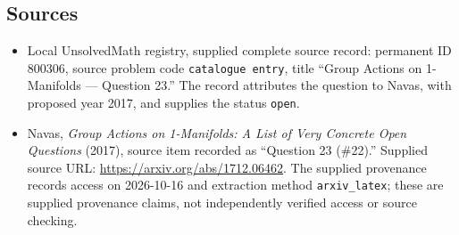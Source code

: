 \documentclass[11pt]{article}
\begin{document}
\subsection{Sources}
\begin{itemize}
\item Local UnsolvedMath registry, supplied complete source record: permanent ID \(800306\), source problem code \texttt{catalogue entry}, title ``Group Actions on 1-Manifolds --- Question 23.'' The record attributes the question to Navas, with proposed year 2017, and supplies the status \texttt{open}.
\item Navas, \emph{Group Actions on 1-Manifolds: A List of Very Concrete Open Questions} (2017), source item recorded as ``Question 23 (\#22).'' Supplied source URL: \url{https://arxiv.org/abs/1712.06462}. The supplied provenance records access on 2026-10-16 and extraction method \texttt{arxiv\_latex}; these are supplied provenance claims, not independently verified access or source checking.
\end{itemize}
\end{document}
